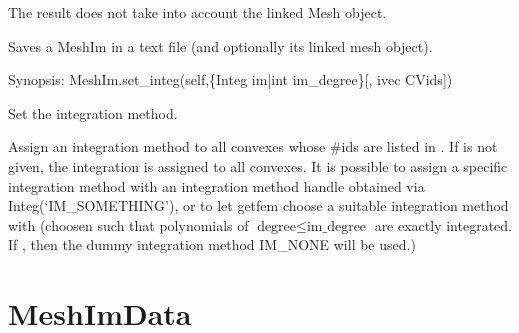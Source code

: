\documentclass[a4paper,11pt,english]{sphinxmanual}
\begin{document}
\begin{fulllineitems}
\begin{fulllineitems}
The result does not take into account the linked Mesh object.

\end{fulllineitems}


\begin{fulllineitems}
\label{\detokenize{python/cmdref_MeshIm:getfem.MeshIm.save}}
Saves a MeshIm in a text file (and optionally its linked mesh object).

\end{fulllineitems}


\begin{fulllineitems}
\label{\detokenize{python/cmdref_MeshIm:getfem.MeshIm.set_integ}}
Synopsis: MeshIm.set\_integ(self,\{Integ im|int im\_degree\}{[}, ivec CVids{]})

Set the integration method.

Assign an integration method to all convexes whose \#ids are
listed in . If  is not given, the integration is
assigned to all convexes. It is possible to assign a specific
integration method with an integration method handle  obtained
via Integ(‘IM\_SOMETHING’), or to let getfem choose a suitable
integration method with  (choosen such that polynomials
of \(\text{degree} \leq \text{im\_degree}\) are exactly integrated.
If , then the dummy integration method IM\_NONE will 
be used.)

\end{fulllineitems}


\end{fulllineitems}



\section{MeshImData}
\label{\detokenize{python/cmdref_MeshImData:meshimdata}}\label{\detokenize{python/cmdref_MeshImData::doc}}
\end{document}
